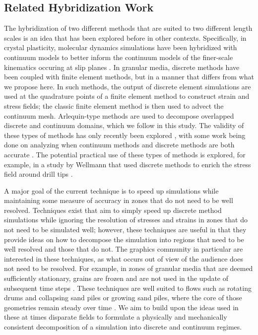 \subsection{Related Hybridization Work}
The hybridization of two different methods that are suited to two different length scales is an idea that has been explored before in other contexts. Specifically, in crystal plasticity, molecular dynamics simulations have been hybridized with continuum models to better inform the continuum models of the finer-scale kinematics occuring at slip planes \cite{Tadmor:1996,Smith:2001,Shimokawa:2007,Zhang:2005,Dhia:1998}. In granular media, discrete methods have been coupled with finite element methods, but in a manner that differs from what we propose here. In such methods, the output of discrete element simulations are used at the quadrature points of a finite element method to construct strain and stress fields; the classic finite element method is then used to advect the continuum mesh. Arlequin-type methods are used to decompose overlapped discrete and continuum domains, which we follow in this study. The validity of these types of methods has only recently been explored \cite{Yan:2010}, with some work being done on analyzing when continuum methods and discrete methods are both accurate \cite{Rycroft:2009,Kamrin:2010,Kamrin:2014}. The potential practical use of these types of methods is explored, for example, in a study by Wellmann that used discrete methods to enrich the stress field around drill tips \cite{Wellmann:2012}.

A major goal of the current technique is to speed up simulations while maintaining some measure of accuracy in zones that do not need to be well resolved. Techniques exist that aim to simply speed up discrete method simulations while ignoring the resolution of stresses and strains in zones that do not need to be simulated well; however, these techniques are useful in that they provide ideas on how to decompose the simulation into regions that need to be well resolved and those that do not. The graphics community in particular are interested in these techniques, as what occurs out of view of the audience does not need to be resolved. For example, in zones of granular media that are deemed sufficiently stationary, grains are frozen and are not used in the update of subsequent time steps \cite{Smith:2005}. These techniques are well suited to flows such as rotating drums and collapsing sand piles or growing sand piles, where the core of those geometries remain steady over time \cite{McCarthy:1998,Hsu:2010,Zhu:2010,Bouchaud:1994}. We aim to build upon the ideas used in these at times disparate fields to formulate a physically and mechanically consistent decomposition of a simulation into discrete and continuum regimes.
